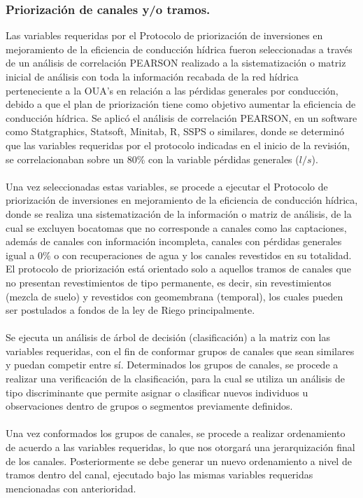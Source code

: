 \documentclass[]{article}
\begin{document}
\subsubsection{Priorización de canales y/o tramos.}

Las variables requeridas por el Protocolo de priorización de inversiones en mejoramiento de la eficiencia de conducción hídrica fueron seleccionadas a través de un análisis de correlación PEARSON realizado a la sistematización o matriz inicial de análisis con toda la información recabada de la red hídrica perteneciente a la OUA's en relación a las pérdidas generales por conducción, debido a que el plan de priorización tiene como objetivo aumentar la eficiencia de conducción hídrica. Se aplicó el análisis de correlación PEARSON, en un software como Statgraphics, Statsoft, Minitab, R, SSPS o similares, donde se determinó que las variables requeridas por el protocolo indicadas en el inicio de la revisión, se correlacionaban sobre un 80\% con la variable pérdidas generales ($l/s$).\\
\\
Una vez seleccionadas estas variables, se procede a ejecutar el Protocolo de priorización de inversiones en mejoramiento de la eficiencia de conducción hídrica, donde se realiza una sistematización de la información o matriz de análisis, de la cual se excluyen bocatomas que no corresponde a canales como las captaciones, además de canales con información incompleta, canales con pérdidas generales igual a 0\% o con recuperaciones de agua y los canales revestidos en su totalidad. El protocolo de priorización está orientado solo a aquellos tramos de canales que no presentan revestimientos de tipo permanente, es decir, sin revestimientos (mezcla de suelo) y revestidos con geomembrana (temporal), los cuales pueden ser postulados a fondos de la ley de Riego principalmente.\\
\\
Se ejecuta un análisis de árbol de decisión (clasificación) a la matriz con las variables requeridas, con el fin de conformar grupos de canales que sean similares y puedan competir entre sí. Determinados los grupos de canales, se procede a realizar una verificación de la clasificación, para la cual se utiliza un análisis de tipo discriminante que permite asignar o clasificar nuevos individuos u observaciones dentro de grupos o segmentos previamente definidos.\\
\\
Una vez conformados los grupos de canales, se procede a realizar ordenamiento de acuerdo a las variables requeridas, lo que nos otorgará una jerarquización final de los canales. Posteriormente se debe generar un nuevo ordenamiento a nivel de tramos dentro del canal, ejecutado bajo las mismas variables requeridas mencionadas con anterioridad.
\end{document}
